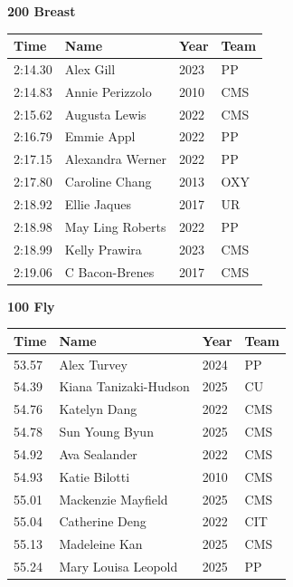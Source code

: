 \vspace{1.2em}
\noindent\begin{minipage}[t]{0.98\textwidth}
\centering
\textbf{\textcolor{teamprimary}{200 Breast}}\par
\vspace{0.5em}
\centering
\small
\renewcommand{\arraystretch}{1.0}
\setlength{\tabcolsep}{4pt}
\begin{tabular}{@{}p{2.5cm}p{4.5cm}p{1.5cm}p{2.5cm}@{}}
\toprule
\textbf{Time} & \textbf{Name} & \textbf{Year} & \textbf{Team} \\
\midrule
2:14.30 & Alex Gill & 2023 & PP \\
2:14.83 & Annie Perizzolo & 2010 & CMS \\
2:15.62 & Augusta Lewis & 2022 & CMS \\
2:16.79 & Emmie Appl & 2022 & PP \\
2:17.15 & Alexandra Werner & 2022 & PP \\
2:17.80 & Caroline Chang & 2013 & OXY \\
2:18.92 & Ellie Jaques & 2017 & UR \\
2:18.98 & May Ling Roberts & 2022 & PP \\
2:18.99 & Kelly Prawira & 2023 & CMS \\
2:19.06 & C Bacon-Brenes & 2017 & CMS \\
\bottomrule
\end{tabular}
\end{minipage}
\vspace{1.2em}
\noindent\begin{minipage}[t]{0.98\textwidth}
\centering
\textbf{\textcolor{teamprimary}{100 Fly}}\par
\vspace{0.5em}
\centering
\small
\renewcommand{\arraystretch}{1.0}
\setlength{\tabcolsep}{4pt}
\begin{tabular}{@{}p{2.5cm}p{4.5cm}p{1.5cm}p{2.5cm}@{}}
\toprule
\textbf{Time} & \textbf{Name} & \textbf{Year} & \textbf{Team} \\
\midrule
53.57 & Alex Turvey & 2024 & PP \\
54.39 & Kiana Tanizaki-Hudson & 2025 & CU \\
54.76 & Katelyn Dang & 2022 & CMS \\
54.78 & Sun Young Byun & 2025 & CMS \\
54.92 & Ava Sealander & 2022 & CMS \\
54.93 & Katie Bilotti & 2010 & CMS \\
55.01 & Mackenzie Mayfield & 2025 & CMS \\
55.04 & Catherine Deng & 2022 & CIT \\
55.13 & Madeleine Kan & 2025 & CMS \\
55.24 & Mary Louisa Leopold & 2025 & PP \\
\bottomrule
\end{tabular}
\end{minipage}
